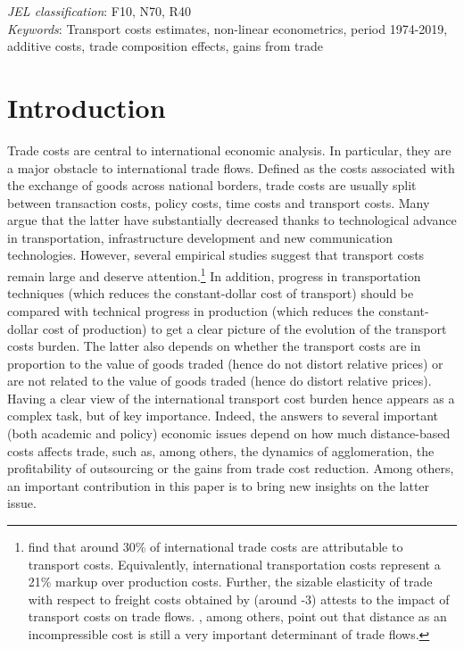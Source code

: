 \documentclass[a4paper,11pt]{article}
\begin{document}
\thispagestyle{empty} \pagestyle{plain} \setcounter{page}{1}

\bigskip


\noindent \emph{JEL classification}: F10, N70, R40 \\
\noindent \emph{Keywords}: Transport costs estimates, non-linear econometrics, period 1974-2019, additive costs, trade composition effects, gains from trade

{\normalsize \vspace{0cm} }

{\normalsize \titlepage }

{\normalsize \newpage }


\section{Introduction \label{sec:Intro}}


Trade costs are central to international economic analysis. In particular, they are a major obstacle to international trade flows. Defined as the costs associated with the exchange of goods across national borders, trade costs are usually split between transaction costs, policy costs, time costs and transport costs. Many argue that the latter have substantially decreased thanks to technological advance in transportation, infrastructure development and new communication technologies.
However, several empirical studies suggest that transport costs remain large and deserve attention.\footnote{\cite{anderson_wincoop_jel} find that around 30\% of international trade costs are attributable to transport costs. Equivalently, international transportation costs represent a 21\% markup over production costs. Further, the sizable elasticity of trade with respect to freight costs obtained by \cite{Behar_Venables} (around -3) attests to the impact of transport costs on trade flows. \cite{Disdier_Head08}, among others, point out that distance as an incompressible cost is still a very important determinant of trade flows.} In addition, progress in transportation techniques (which reduces the constant-dollar cost of transport) should be compared with technical progress in production (which reduces the constant-dollar cost of production) to get a clear picture of the evolution
of the transport costs burden. The latter also depends on whether the transport costs are in proportion to the value of goods traded (hence do not distort relative prices) or are not related to the value of goods traded (hence do distort relative prices). Having a clear view of the international transport cost burden hence appears as a complex task, but of key importance. Indeed, the answers to several important (both academic and policy) economic issues depend on how much distance-based costs affects trade, such as, among others, the dynamics of agglomeration, the profitability of outsourcing or the gains from trade cost reduction. Among others, an important contribution in this paper is to bring new insights on the latter issue.\smallskip
\end{document}
